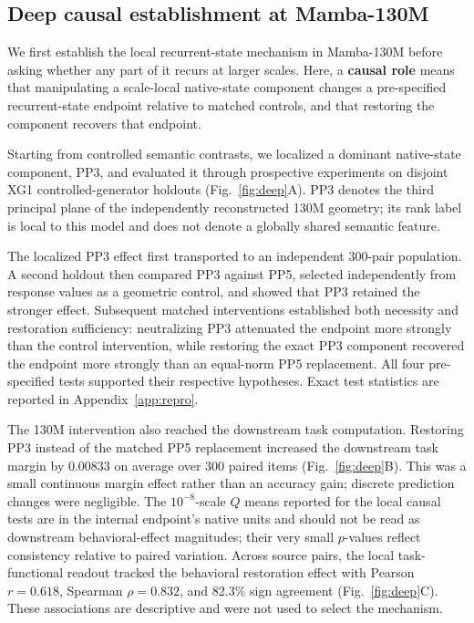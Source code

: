 \documentclass{article}
\begin{document}
\subsection{Deep causal establishment at Mamba-130M}
\label{sec:deep}

We first establish the local recurrent-state mechanism in Mamba-130M before asking whether any part of it recurs at larger scales. Here, a \textbf{causal role} means that manipulating a scale-local native-state component changes a pre-specified recurrent-state endpoint relative to matched controls, and that restoring the component recovers that endpoint.

Starting from controlled semantic contrasts, we localized a dominant native-state component, PP3, and evaluated it through prospective experiments on disjoint XG1 controlled-generator holdouts (Fig.~\ref{fig:deep}A). PP3 denotes the third principal plane of the independently reconstructed 130M geometry; its rank label is local to this model and does not denote a globally shared semantic feature.

The localized PP3 effect first transported to an independent 300-pair population. A second holdout then compared PP3 against PP5, selected independently from response values as a geometric control, and showed that PP3 retained the stronger effect. Subsequent matched interventions established both necessity and restoration sufficiency: neutralizing PP3 attenuated the endpoint more strongly than the control intervention, while restoring the exact PP3 component recovered the endpoint more strongly than an equal-norm PP5 replacement. All four pre-specified tests supported their respective hypotheses. Exact test statistics are reported in Appendix~\ref{app:repro}.

The 130M intervention also reached the downstream task computation. Restoring PP3 instead of the matched PP5 replacement increased the downstream task margin by $0.00833$ on average over 300 paired items (Fig.~\ref{fig:deep}B). This was a small continuous margin effect rather than an accuracy gain; discrete prediction changes were negligible. The $10^{-8}$-scale $Q$ means reported for the local causal tests are in the internal endpoint's native units and should not be read as downstream behavioral-effect magnitudes; their very small $p$-values reflect consistency relative to paired variation. Across source pairs, the local task-functional readout tracked the behavioral restoration effect with Pearson $r=0.618$, Spearman $\rho=0.832$, and 82.3\% sign agreement (Fig.~\ref{fig:deep}C). These associations are descriptive and were not used to select the mechanism.
\end{document}
